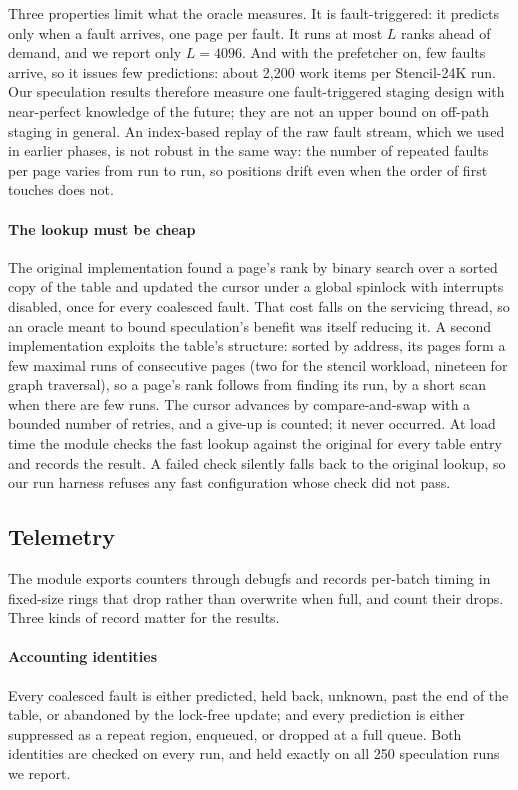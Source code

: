 Three properties limit what the oracle measures. It is fault-triggered: it
predicts only when a fault arrives, one page per fault. It runs at most $L$ ranks
ahead of demand, and we report only $L = 4096$. And with the prefetcher on, few
faults arrive, so it issues few predictions: about 2{,}200 work items per
Stencil-24K run. Our speculation results therefore measure one fault-triggered
staging design with near-perfect knowledge of the future; they are not an upper
bound on off-path staging in general. An index-based replay
of the raw fault stream, which we used in earlier phases, is not robust in
the same way: the number of repeated faults per page varies from run to run,
so positions drift even when the order of first touches does not.

\paragraph{The lookup must be cheap}
The original implementation found a page's rank by binary search over a
sorted copy of the table and updated the cursor under a global spinlock with
interrupts disabled, once for every coalesced fault. That cost falls on the
servicing thread, so an oracle meant to bound speculation's benefit was
itself reducing it. A second implementation exploits the table's structure:
sorted by address, its pages form a few maximal runs of consecutive pages
(two for the stencil workload, nineteen for graph traversal), so a page's rank
follows from finding its run, by a short scan when there are few runs. The
cursor advances by compare-and-swap with a bounded number of retries, and a
give-up is counted; it never occurred. At load time the module checks the fast
lookup against the original for every table entry and records the result. A
failed check silently falls back to the original lookup, so our run harness
refuses any fast configuration whose check did not pass.

\subsection{Telemetry}
\label{sec:design-telemetry}

The module exports counters through debugfs and records per-batch timing in
fixed-size rings that drop rather than overwrite when full, and count their
drops. Three kinds of record matter for the results.

\paragraph{Accounting identities}
Every coalesced fault is either predicted, held back, unknown, past the end
of the table, or abandoned by the lock-free update; and every prediction is
either suppressed as a repeat region, enqueued, or dropped at a full queue.
Both identities are checked on every run, and held exactly on all 250 speculation runs we report.

